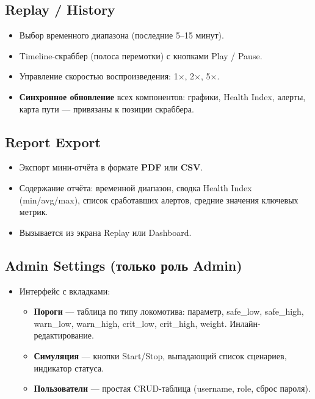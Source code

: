 \documentclass[12pt,a4paper]{article}
\begin{document}
\subsection{Replay / History}

\begin{itemize}[nosep]
  \item Выбор временного диапазона (последние 5--15 минут).
  \item Timeline-скраббер (полоса перемотки) с кнопками Play / Pause.
  \item Управление скоростью воспроизведения: 1$\times$, 2$\times$, 5$\times$.
  \item \textbf{Синхронное обновление} всех компонентов: графики, Health Index, алерты, карта пути --- привязаны к позиции скраббера.
\end{itemize}

\subsection{Report Export}

\begin{itemize}[nosep]
  \item Экспорт мини-отчёта в формате \textbf{PDF} или \textbf{CSV}.
  \item Содержание отчёта: временной диапазон, сводка Health Index (min/avg/max), список сработавших алертов, средние значения ключевых метрик.
  \item Вызывается из экрана Replay или Dashboard.
\end{itemize}

\subsection{Admin Settings (только роль Admin)}

\begin{itemize}[nosep]
  \item Интерфейс с вкладками:
    \begin{itemize}[nosep]
      \item \textbf{Пороги} --- таблица по типу локомотива: параметр, safe\_low, safe\_high, warn\_low, warn\_high, crit\_low, crit\_high, weight. Инлайн-редактирование.
      \item \textbf{Симуляция} --- кнопки Start/Stop, выпадающий список сценариев, индикатор статуса.
      \item \textbf{Пользователи} --- простая CRUD-таблица (username, role, сброс пароля).
    \end{itemize}
\end{itemize}
\end{document}
